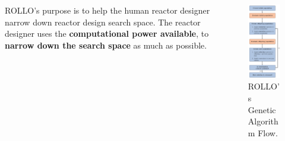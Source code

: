 \begin{frame}
\begin{columns}
\begin{column}{0.7\textwidth}
            \vspace{0.2cm}
            ROLLO's purpose is to help the human reactor designer narrow down reactor design 
            search space. The reactor designer uses the \textbf{computational power 
            available}, to \textbf{narrow down the search space} as much as possible.
        \end{column}
        \begin{column}{0.3\textwidth}
            \begin{figure}
                \includegraphics[width=0.85\linewidth]{figures/rollo-flow2.png} 
                \caption{ROLLO's Genetic Algorithm Flow.}
            \end{figure}
        \end{column}
    \end{columns}
\end{frame}
